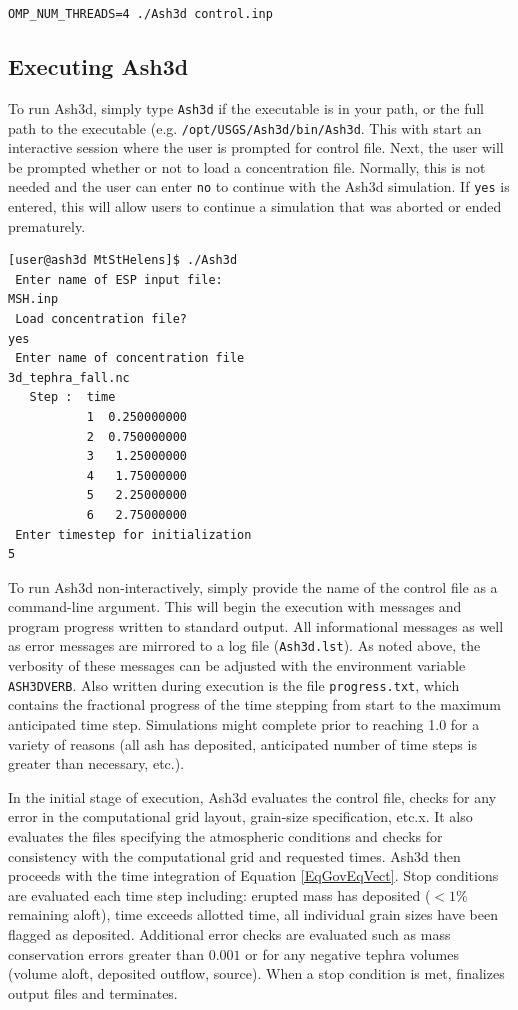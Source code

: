 \texttt{OMP\_NUM\_THREADS=4 ./Ash3d control.inp}



\subsection{Executing Ash3d}
To run Ash3d, simply type \texttt{Ash3d} if the executable is in your path, or
the full path to the executable (e.g. \texttt{/opt/USGS/Ash3d/bin/Ash3d}. This
with start an interactive session where the user is prompted for control file.
Next, the user will be prompted whether or not to load a concentration file.
Normally, this is not needed and the user can enter \texttt{no} to continue
with the Ash3d simulation. If \texttt{yes} is entered,
this will allow users to continue a simulation that was aborted or ended prematurely.

\begin{verbatim}
[user@ash3d MtStHelens]$ ./Ash3d 
 Enter name of ESP input file:
MSH.inp
 Load concentration file?
yes
 Enter name of concentration file
3d_tephra_fall.nc
   Step :  time
           1  0.250000000    
           2  0.750000000    
           3   1.25000000    
           4   1.75000000    
           5   2.25000000    
           6   2.75000000    
 Enter timestep for initialization
5
\end{verbatim}

To run Ash3d non-interactively, simply provide the name of the control file as
a command-line argument. This will begin the execution with messages and program
progress written to standard output. All informational messages as well as
error messages are mirrored to a log file (\texttt{Ash3d.lst}). As noted above,
the verbosity of these messages can be adjusted with the environment variable
\texttt{ASH3DVERB}. Also written during execution is the file \texttt{progress.txt},
which contains the fractional progress of the time stepping from start to the maximum
anticipated time step. Simulations might complete prior to reaching 1.0 for a
variety of reasons (all ash has deposited, anticipated number of time steps is
greater than necessary, etc.).

In the initial stage of execution, Ash3d evaluates the control file, checks for
any error in the computational grid layout, grain-size specification, etc.x. It
also evaluates the files specifying the atmospheric conditions and checks for
consistency with the computational grid and requested times. Ash3d then
proceeds with the time integration of Equation \ref{EqGovEqVect}. Stop conditions
are evaluated each time step including: erupted mass has deposited ($<1\%$ remaining aloft),
time exceeds allotted time, all individual grain sizes have been flagged as deposited.
Additional error checks are evaluated such as mass conservation errors greater than
$0.001$ or for any negative tephra volumes (volume aloft, deposited outflow, source).
When a stop condition is met, finalizes output files and terminates.
%
